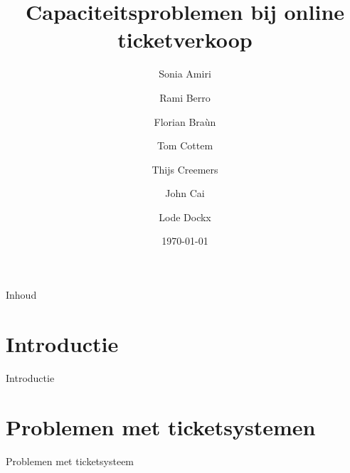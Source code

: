 \documentclass{beamer}
\title{Capaciteitsproblemen bij online ticketverkoop}
\author{Sonia Amiri \and Rami Berro \and Florian Braùn \and Tom Cottem \and Thijs Creemers \and John Cai \and Lode Dockx}
\date{\today}
\begin{document}
\begin{frame}
  \titlepage
\end{frame}

\begin{frame}{Inhoud}
  \tableofcontents
\end{frame}

\section{Introductie}
\begin{frame}{Introductie}

\end{frame}
\section{Problemen met ticketsystemen}
\begin{frame}{Problemen met ticketsysteem}
    
\end{frame}
    
    
    
    
    
\end{document}

